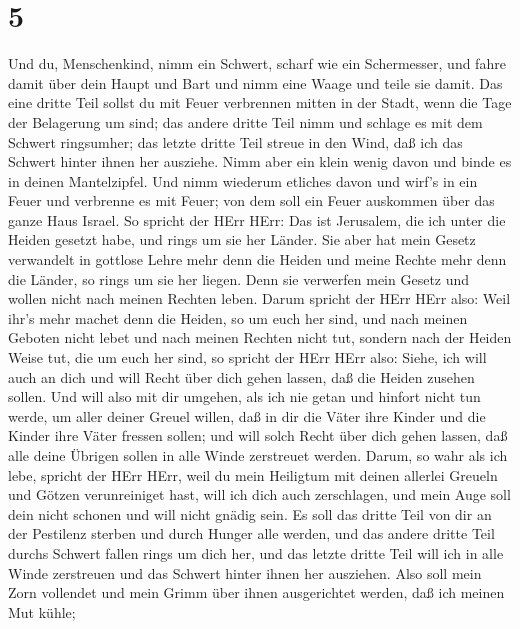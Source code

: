 \hypertarget{section-4}{%
\section{5}\label{section-4}}

 Und du, Menschenkind, nimm ein Schwert, scharf wie ein
Schermesser, und fahre damit über dein Haupt und Bart und nimm eine
Waage und teile sie damit.  Das eine dritte Teil sollst du
mit Feuer verbrennen mitten in der Stadt, wenn die Tage der Belagerung
um sind; das andere dritte Teil nimm und schlage es mit dem Schwert
ringsumher; das letzte dritte Teil streue in den Wind, daß ich das
Schwert hinter ihnen her ausziehe.  Nimm aber ein klein
wenig davon und binde es in deinen Mantelzipfel.  Und nimm
wiederum etliches davon und wirf's in ein Feuer und verbrenne es mit
Feuer; von dem soll ein Feuer auskommen über das ganze Haus Israel.
 So spricht der HErr HErr: Das ist Jerusalem, die ich unter
die Heiden gesetzt habe, und rings um sie her Länder.  Sie
aber hat mein Gesetz verwandelt in gottlose Lehre mehr denn die Heiden
und meine Rechte mehr denn die Länder, so rings um sie her liegen. Denn
sie verwerfen mein Gesetz und wollen nicht nach meinen Rechten leben.
 Darum spricht der HErr HErr also: Weil ihr's mehr machet
denn die Heiden, so um euch her sind, und nach meinen Geboten nicht
lebet und nach meinen Rechten nicht tut, sondern nach der Heiden Weise
tut, die um euch her sind,  so spricht der HErr HErr also:
Siehe, ich will auch an dich und will Recht über dich gehen lassen, daß
die Heiden zusehen sollen.  Und will also mit dir umgehen,
als ich nie getan und hinfort nicht tun werde, um aller deiner Greuel
willen,  daß in dir die Väter ihre Kinder und die Kinder
ihre Väter fressen sollen; und will solch Recht über dich gehen lassen,
daß alle deine Übrigen sollen in alle Winde zerstreuet werden.
 Darum, so wahr als ich lebe, spricht der HErr HErr, weil
du mein Heiligtum mit deinen allerlei Greueln und Götzen verunreiniget
hast, will ich dich auch zerschlagen, und mein Auge soll dein nicht
schonen und will nicht gnädig sein.  Es soll das dritte
Teil von dir an der Pestilenz sterben und durch Hunger alle werden, und
das andere dritte Teil durchs Schwert fallen rings um dich her, und das
letzte dritte Teil will ich in alle Winde zerstreuen und das Schwert
hinter ihnen her ausziehen.  Also soll mein Zorn vollendet
und mein Grimm über ihnen ausgerichtet werden, daß ich meinen Mut kühle;
